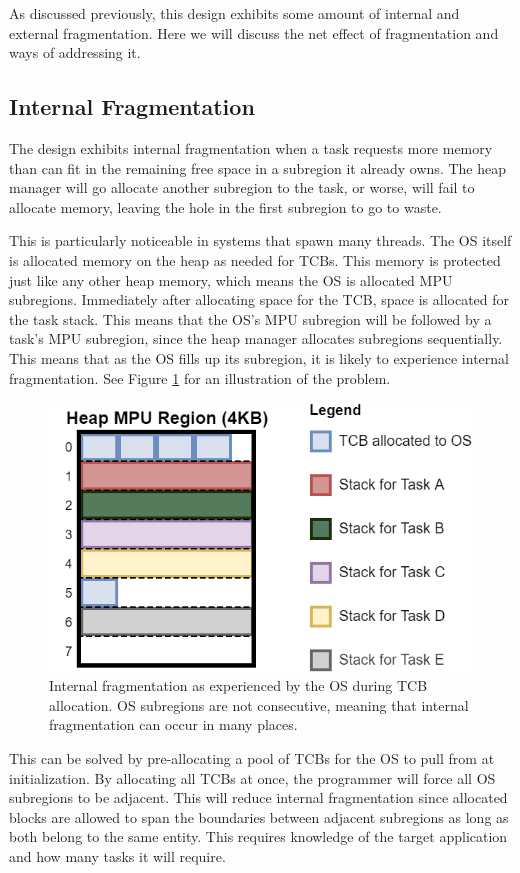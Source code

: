 As discussed previously, this design exhibits some amount of internal and external fragmentation.
Here we will discuss the net effect of fragmentation and ways of addressing it.

\subsection{Internal Fragmentation}

The design exhibits internal fragmentation when a task requests more memory than can fit in the remaining free space in a subregion it already owns. The heap manager will go allocate another subregion to the task, or worse, will fail to allocate memory, leaving the hole in the first subregion to go to waste.

This is particularly noticeable in systems that spawn many threads. The OS itself is allocated memory on the heap as needed for TCBs. This memory is protected just like any other heap memory, which means the OS is allocated MPU subregions. Immediately after allocating space for the TCB, space is allocated for the task stack. This means that the OS's MPU subregion will be followed by a task's MPU subregion, since the heap manager allocates subregions sequentially. This means that as the OS fills up its subregion, it is likely to experience internal fragmentation. See Figure \ref{fig:internal_frag} for an illustration of the problem.

\begin{figure}[hbtp]
	\centering
	\includegraphics[width=0.5\linewidth]{figs/OS_int_frag.png}
	\caption{Internal fragmentation as experienced by the OS during TCB allocation. OS subregions are not consecutive, meaning that internal fragmentation can occur in many places.}
	\label{fig:internal_frag}
\end{figure}

This can be solved by pre-allocating a pool of TCBs for the OS to pull from at initialization. By allocating all TCBs at once, the programmer will force all OS subregions to be adjacent. This will reduce internal fragmentation since allocated blocks are allowed to span the boundaries between adjacent subregions as long as both belong to the same entity. This requires knowledge of the target application and how many tasks it will require.

